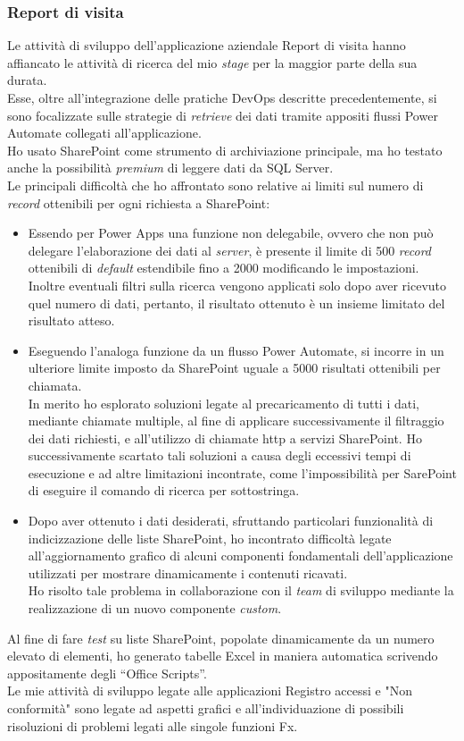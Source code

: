 \subsubsection*{Report di visita}
Le attività di sviluppo dell'applicazione aziendale Report di visita hanno affiancato le attività di ricerca del mio \emph{stage} per la maggior parte della sua durata.\\
Esse, oltre all'integrazione delle pratiche \gls{DevOps} descritte precedentemente, si sono focalizzate sulle strategie di \emph{retrieve} dei dati tramite appositi flussi Power Automate collegati all'applicazione.\\
Ho usato SharePoint come strumento di archiviazione principale, ma ho testato anche la possibilità \emph{premium} di leggere dati da SQL Server.\\
Le principali difficoltà che ho affrontato sono relative ai limiti sul numero di \emph{record} ottenibili per ogni richiesta a SharePoint:
\begin{itemize}
    \item Essendo per Power Apps una funzione non delegabile, ovvero che non può delegare l'elaborazione dei dati al \emph{server}, è presente il limite di 500 \emph{record} ottenibili di \emph{default} estendibile fino a 2000 modificando le impostazioni.
    Inoltre eventuali filtri sulla ricerca vengono applicati solo dopo aver ricevuto quel numero di dati, pertanto, il risultato ottenuto è un insieme limitato del risultato atteso.
    \item Eseguendo l'analoga funzione da un flusso Power Automate, si incorre in un ulteriore limite imposto da SharePoint uguale a 5000 risultati ottenibili per chiamata.\\
    In merito ho esplorato soluzioni legate al precaricamento di tutti i dati, mediante chiamate multiple, al fine di applicare successivamente il filtraggio dei dati richiesti, e all'utilizzo di chiamate \gls{http} a servizi SharePoint.
    Ho successivamente scartato tali soluzioni a causa degli eccessivi tempi di esecuzione e ad altre limitazioni incontrate, come l'impossibilità per SarePoint di eseguire il comando di ricerca per sottostringa.
    \item Dopo aver ottenuto i dati desiderati, sfruttando particolari funzionalità di indicizzazione delle liste SharePoint, ho incontrato difficoltà legate all'aggiornamento grafico di alcuni componenti fondamentali dell'applicazione utilizzati per mostrare dinamicamente i contenuti ricavati.\\
    Ho risolto tale problema in collaborazione con il \emph{team} di sviluppo mediante la realizzazione di un nuovo componente \emph{custom}.  
\end{itemize}
Al fine di fare \emph{test} su liste SharePoint, popolate dinamicamente da un numero elevato di elementi, ho generato tabelle Excel in maniera automatica scrivendo appositamente degli “Office Scripts”.\\
Le mie attività di sviluppo legate alle applicazioni Registro accessi e "Non conformità" sono legate ad aspetti grafici e all'individuazione di possibili risoluzioni di problemi legati alle singole funzioni Fx. 



